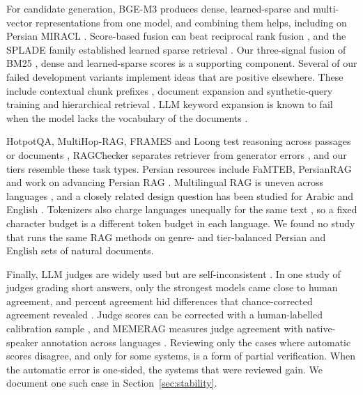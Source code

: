 For candidate generation, BGE-M3 produces dense, learned-sparse and multi-vector representations from one model, and combining them helps, including on Persian MIRACL \citep{chen2024bgem3,zhang2023miracl}. Score-based fusion can beat reciprocal rank fusion \citep{bruch2023fusion,cormack2009rrf}, and the SPLADE family established learned sparse retrieval \citep{lassance2024spladev3}. Our three-signal fusion of BM25 \citep{robertson2009bm25}, dense and learned-sparse scores is a supporting component. Several of our failed development variants implement ideas that are positive elsewhere. These include contextual chunk prefixes \citep{anthropic2024contextual}, document expansion and synthetic-query training \citep{gospodinov2023doc2query,bonifacio2022inpars,dai2023promptagator} and hierarchical retrieval \citep{sarthi2024raptor}. LLM keyword expansion is known to fail when the model lacks the vocabulary of the documents \citep{abe2025expansion}.

HotpotQA, MultiHop-RAG, FRAMES and Loong test reasoning across passages or documents \citep{yang2018hotpotqa,tang2024multihoprag,krishna2024frames,wang2024loong}, RAGChecker separates retriever from generator errors \citep{ru2024ragchecker}, and our tiers resemble these task types. Persian resources include FaMTEB, PersianRAG and work on advancing Persian RAG \citep{zinvandi2025famteb,hosseini2024persianrag,hosseinbeigi2025persianrag}. Multilingual RAG is uneven across languages \citep{wu2024multilingual}, and a closely related design question has been studied for Arabic and English \citep{amiraz2025crosslingual}. Tokenizers also charge languages unequally for the same text \citep{petrov2023tokenizers}, so a fixed character budget is a different token budget in each language. We found no study that runs the same RAG methods on genre- and tier-balanced Persian and English sets of natural documents.

Finally, LLM judges are widely used \citep{zheng2023judge} but are self-inconsistent \citep{haldar2025roulette}. In one study of judges grading short answers, only the strongest models came close to human agreement, and percent agreement hid differences that chance-corrected agreement revealed \citep{thakur2025judging}. Judge scores can be corrected with a human-labelled calibration sample \citep{lee2026judgereport}, and MEMERAG measures judge agreement with native-speaker annotation across languages \citep{cruzblandon2025memerag}. Reviewing only the cases where automatic scores disagree, and only for some systems, is a form of partial verification. When the automatic error is one-sided, the systems that were reviewed gain. We document one such case in Section~\ref{sec:stability}.
